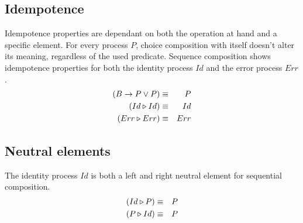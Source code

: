 \subsection{Idempotence}
Idempotence properties are dependant on both the operation at hand and a specific element. For every process $P$, choice composition with itself doesn't alter its meaning, regardless of the used predicate. Sequence composition shows idempotence properties for both the identity process $Id$ and the error process $Err$.
\begin{eqnarray*}
  \left( B \to P \vee P \right) & \equiv & P \\
  \left( Id \triangleright Id \right) & \equiv & Id \\
  \left( Err \triangleright Err \right) & \equiv & Err \\
\end{eqnarray*}

\subsection{Neutral elements}
The identity process $Id$ is both a left and right neutral element for sequential composition.
\begin{eqnarray*}
  \left( Id \triangleright P \right) & \equiv & P \\
  \left( P \triangleright Id \right) & \equiv & P
\end{eqnarray*}